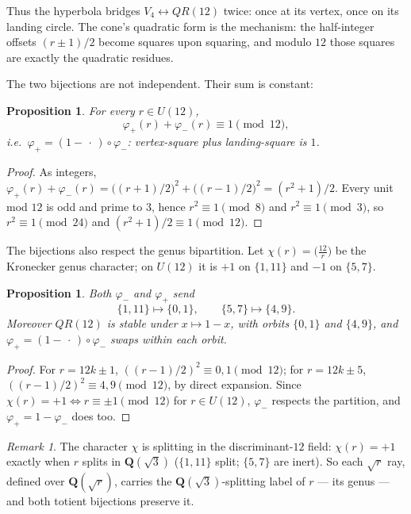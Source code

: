 \documentclass[11pt]{amsart}
\newtheorem{proposition}[theorem]{Proposition}
\theoremstyle{remark}
\newtheorem*{remark}{Remark}
\begin{document}
Thus the hyperbola bridges $V_4\leftrightarrow QR(12)$ twice: once at
its vertex, once on its landing circle.  The cone's quadratic form is
the mechanism: the half-integer offsets $(r\pm1)/2$ become squares upon
squaring, and modulo $12$ those squares are exactly the quadratic
residues.

The two bijections are not independent.  Their sum is constant:

\begin{proposition}\label{prop:complement}
For every $r\in U(12)$,
\[
\varphi_+(r)+\varphi_-(r)\equiv 1\pmod{12},
\]
i.e.\ $\varphi_+=(1-\,\cdot\,)\circ\varphi_-$: vertex-square plus
landing-square is $1$.
\end{proposition}
\begin{proof}
As integers,
$\varphi_+(r)+\varphi_-(r)=\bigl((r+1)/2\bigr)^2+\bigl((r-1)/2\bigr)^2
=(r^2+1)/2$.  Every unit mod $12$ is odd and prime to $3$, hence
$r^2\equiv 1\pmod 8$ and $r^2\equiv 1\pmod 3$, so $r^2\equiv 1\pmod{24}$
and $(r^2+1)/2\equiv 1\pmod{12}$.
\end{proof}

The bijections also respect the genus bipartition.  Let
$\chi(r)=\bigl(\frac{12}{r}\bigr)$ be the Kronecker genus character;
on $U(12)$ it is $+1$ on $\{1,11\}$ and $-1$ on $\{5,7\}$.

\begin{proposition}\label{prop:genus}
Both $\varphi_-$ and $\varphi_+$ send
\[
\{1,11\}\longmapsto\{0,1\},\qquad
\{5,7\}\longmapsto\{4,9\}.
\]
Moreover $QR(12)$ is stable under $x\mapsto 1-x$, with orbits
$\{0,1\}$ and $\{4,9\}$, and $\varphi_+=(1-\,\cdot\,)\circ\varphi_-$
swaps within each orbit.
\end{proposition}
\begin{proof}
For $r=12k\pm 1$, $((r-1)/2)^2\equiv 0,1\pmod{12}$; for $r=12k\pm 5$,
$((r-1)/2)^2\equiv 4,9\pmod{12}$, by direct expansion.  Since
$\chi(r)=+1\iff r\equiv\pm 1\pmod{12}$ for $r\in U(12)$, $\varphi_-$
respects the partition, and $\varphi_+=1-\varphi_-$ does too.
\end{proof}

\begin{remark}
The character $\chi$ is splitting in the discriminant-$12$ field:
$\chi(r)=+1$ exactly when $r$ splits in $\mathbf{Q}(\sqrt3)$
($\{1,11\}$ split; $\{5,7\}$ are inert).  So each $\sqrt r$ ray, defined
over $\mathbf{Q}(\sqrt r)$, carries the $\mathbf{Q}(\sqrt3)$-splitting
label of $r$ --- its genus --- and both totient bijections preserve it.
\end{remark}
\end{document}
